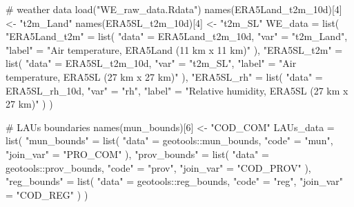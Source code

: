 \documentclass[
  letterpaper,
  DIV=11,
  numbers=noendperiod]{scrartcl}
\newenvironment{Shaded}{\begin{snugshade}}{\end{snugshade}}
\newcommand{\CommentTok}[1]{\textcolor[rgb]{0.37,0.37,0.37}{#1}}
\newcommand{\DecValTok}[1]{\textcolor[rgb]{0.68,0.00,0.00}{#1}}
\newcommand{\FunctionTok}[1]{\textcolor[rgb]{0.28,0.35,0.67}{#1}}
\newcommand{\NormalTok}[1]{\textcolor[rgb]{0.00,0.23,0.31}{#1}}
\newcommand{\OtherTok}[1]{\textcolor[rgb]{0.00,0.23,0.31}{#1}}
\newcommand{\SpecialCharTok}[1]{\textcolor[rgb]{0.37,0.37,0.37}{#1}}
\newcommand{\StringTok}[1]{\textcolor[rgb]{0.13,0.47,0.30}{#1}}
\begin{document}
\begin{Shaded}
\begin{Highlighting}[]
\CommentTok{\# weather data}
\FunctionTok{load}\NormalTok{(}\StringTok{"WE\_raw\_data.Rdata"}\NormalTok{)}
\FunctionTok{names}\NormalTok{(ERA5Land\_t2m\_10d)[}\DecValTok{4}\NormalTok{] }\OtherTok{\textless{}{-}} \StringTok{"t2m\_Land"}
\FunctionTok{names}\NormalTok{(ERA5SL\_t2m\_10d)[}\DecValTok{4}\NormalTok{] }\OtherTok{\textless{}{-}} \StringTok{"t2m\_SL"}
\NormalTok{WE\_data }\OtherTok{=} \FunctionTok{list}\NormalTok{(}
  \StringTok{"ERA5Land\_t2m"} \OtherTok{=} \FunctionTok{list}\NormalTok{(}
    \StringTok{"data"} \OtherTok{=}\NormalTok{ ERA5Land\_t2m\_10d,}
    \StringTok{"var"} \OtherTok{=} \StringTok{"t2m\_Land"}\NormalTok{,}
    \StringTok{"label"} \OtherTok{=} \StringTok{"Air temperature, ERA5Land (11 km x 11 km)"}
\NormalTok{  ),}
  \StringTok{"ERA5SL\_t2m"} \OtherTok{=} \FunctionTok{list}\NormalTok{(}
    \StringTok{"data"} \OtherTok{=}\NormalTok{ ERA5SL\_t2m\_10d,}
    \StringTok{"var"} \OtherTok{=} \StringTok{"t2m\_SL"}\NormalTok{,}
    \StringTok{"label"} \OtherTok{=} \StringTok{"Air temperature, ERA5SL (27 km x 27 km)"}
\NormalTok{  ),}
  \StringTok{"ERA5SL\_rh"} \OtherTok{=} \FunctionTok{list}\NormalTok{(}
    \StringTok{"data"} \OtherTok{=}\NormalTok{ ERA5SL\_rh\_10d,}
    \StringTok{"var"} \OtherTok{=} \StringTok{"rh"}\NormalTok{,}
    \StringTok{"label"} \OtherTok{=} \StringTok{"Relative humidity, ERA5SL (27 km x 27 km)"}
\NormalTok{  )}
\NormalTok{)}

\CommentTok{\# LAUs boundaries}
\FunctionTok{names}\NormalTok{(mun\_bounds)[}\DecValTok{6}\NormalTok{] }\OtherTok{\textless{}{-}} \StringTok{"COD\_COM"}
\NormalTok{LAUs\_data }\OtherTok{=} \FunctionTok{list}\NormalTok{(}
  \StringTok{"mun\_bounds"} \OtherTok{=} \FunctionTok{list}\NormalTok{(}
    \StringTok{"data"} \OtherTok{=}\NormalTok{ geotools}\SpecialCharTok{::}\NormalTok{mun\_bounds,}
    \StringTok{"code"} \OtherTok{=} \StringTok{"mun"}\NormalTok{,}
    \StringTok{"join\_var"} \OtherTok{=} \StringTok{"PRO\_COM"}
\NormalTok{  ),}
  \StringTok{"prov\_bounds"} \OtherTok{=} \FunctionTok{list}\NormalTok{(}
    \StringTok{"data"} \OtherTok{=}\NormalTok{ geotools}\SpecialCharTok{::}\NormalTok{prov\_bounds,}
    \StringTok{"code"} \OtherTok{=} \StringTok{"prov"}\NormalTok{,}
    \StringTok{"join\_var"} \OtherTok{=} \StringTok{"COD\_PROV"}
\NormalTok{  ),}
  \StringTok{"reg\_bounds"} \OtherTok{=} \FunctionTok{list}\NormalTok{(}
    \StringTok{"data"} \OtherTok{=}\NormalTok{ geotools}\SpecialCharTok{::}\NormalTok{reg\_bounds,}
    \StringTok{"code"} \OtherTok{=} \StringTok{"reg"}\NormalTok{,}
    \StringTok{"join\_var"} \OtherTok{=} \StringTok{"COD\_REG"}
\NormalTok{  )}
\NormalTok{)}
\end{Highlighting}
\end{Shaded}
\end{document}
